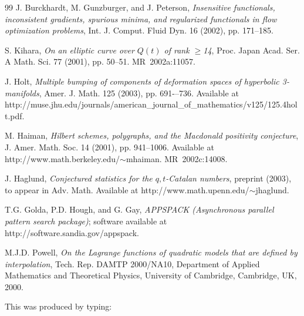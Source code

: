 \documentclass[]{interact}
\theoremstyle{plain}%
\theoremstyle{definition}
\theoremstyle{remark}
\begin{document}
\begin{thebibliography}{99}
J. Burckhardt, M. Gunzburger, and J. Peterson, \emph{Insensitive functionals,
  inconsistent gradients, spurious minima, and regularized functionals in flow
  optimization problems}, Int. J. Comput. Fluid Dyn. 16 (2002), pp. 171--185.

S. Kihara, \emph{On an elliptic curve over $Q(t)$ of rank $\geq$14}, Proc.
  Japan Acad. Ser. A Math. Sci. 77 (2001), pp. 50--51. MR~2002a:11057.

J. Holt, \emph{Multiple bumping of components of deformation spaces of
  hyperbolic 3-manifolds}, Amer. J. Math. 125 (2003), pp. 691-–736. Available at
  http://muse.jhu.edu/journals/american\_journal\_of\_mathematics/v125/125.4holt.pdf.

M. Haiman, \emph{Hilbert schemes, polygraphs, and the Macdonald positivity
  conjecture}, J. Amer. Math. Soc. 14 (2001), pp. 941--1006. Available at
  http://www.math.berkeley.edu/$\sim$mhaiman. MR~2002c:14008.

J. Haglund, \emph{Conjectured statistics for the $q,t$-Catalan numbers},
  preprint (2003), to appear in Adv. Math. Available at
  http://www.math.upenn.edu/$\sim$jhaglund.

T.G. Golda, P.D. Hough, and G. Gay, \emph{APPSPACK (Asynchronous parallel
  pattern search package)}; software available at
  http://software.sandia.gov/appspack.

M.J.D. Powell, \emph{On the Lagrange functions of quadratic models that are
  defined by interpolation}, Tech. Rep. DAMTP 2000/NA10, Department of Applied
  Mathematics and Theoretical Physics, University of Cambridge, Cambridge, UK,
  2000.

\end{thebibliography}
\bigskip
\noindent This was produced by typing:
\medskip
\end{document}
